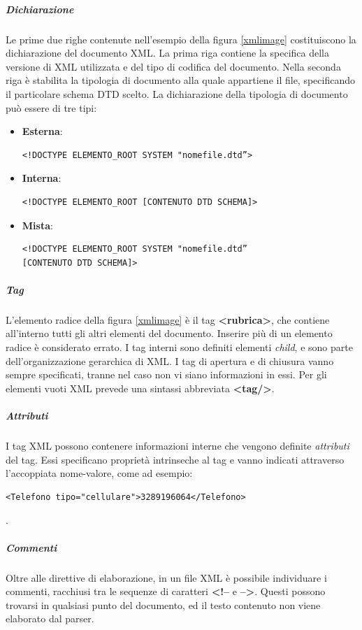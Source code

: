 \subparagraph{Dichiarazione}
Le prime due righe contenute nell'esempio della figura \ref{xmlimage} costituiscono la dichiarazione del documento XML.
La prima riga contiene la specifica della versione di XML utilizzata e del tipo di codifica del documento. 
Nella seconda riga è stabilita la tipologia di documento alla quale appartiene il file, specificando il particolare schema DTD scelto.
La dichiarazione della tipologia di documento può essere di tre tipi:
\begin{itemize}
\item \textbf{Esterna}:
\lstset{language=MYXML}
\begin{lstlisting}
<!DOCTYPE ELEMENTO_ROOT SYSTEM "nomefile.dtd”>
\end{lstlisting}
\item \textbf{Interna}:
\begin{lstlisting}
<!DOCTYPE ELEMENTO_ROOT [CONTENUTO DTD SCHEMA]>
\end{lstlisting}
\item \textbf{Mista}:
\begin{lstlisting}
<!DOCTYPE ELEMENTO_ROOT SYSTEM "nomefile.dtd”
[CONTENUTO DTD SCHEMA]>
\end{lstlisting}
\end{itemize}

\subparagraph{Tag}
L'elemento radice della figura \ref{xmlimage} è il tag \textbf{<rubrica>}, che contiene all'interno tutti gli altri elementi del documento.
Inserire più di un elemento radice è considerato errato. I tag interni sono definiti elementi \textit{child}, e sono parte dell'organizzazione gerarchica di XML.
I tag di apertura e di chiusura vanno sempre specificati, tranne nel caso non vi siano informazioni in essi. Per gli elementi vuoti XML prevede una sintassi abbreviata \textbf{<tag/>}.

\subparagraph{Attributi}
I tag XML possono contenere informazioni interne che vengono definite \textit{attributi} del tag. Essi specificano proprietà intrinseche al tag e vanno indicati attraverso l'accoppiata nome-valore, come ad esempio:
\lstset{language=MYXML}
\begin{lstlisting}
<Telefono tipo="cellulare">3289196064</Telefono>
\end{lstlisting}.


\subparagraph{Commenti}
Oltre alle direttive di elaborazione, in un file XML è possibile individuare i commenti, racchiusi tra le sequenze di caratteri \textbf{<!--} e \textbf{-->}. Questi possono trovarsi in qualsiasi punto del documento, ed il testo contenuto non viene elaborato dal parser.


